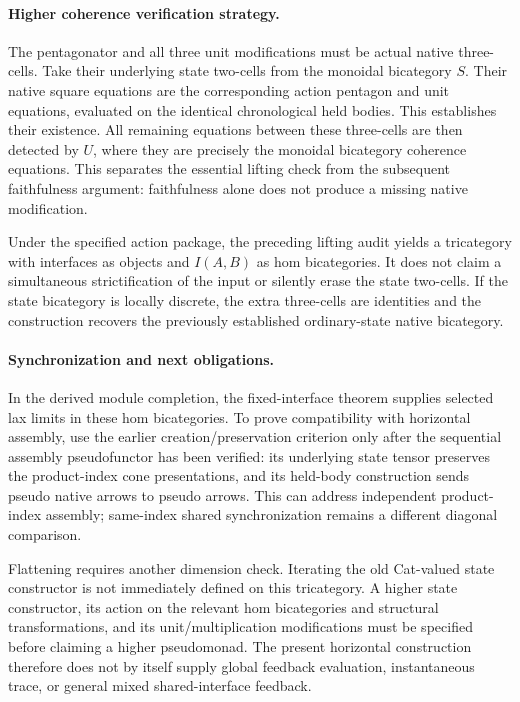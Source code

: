\documentclass{article}
\begin{document}
\paragraph{Higher coherence verification strategy.} The pentagonator and all three unit modifications must be actual native three-cells. Take their underlying state two-cells from the monoidal bicategory $S$. Their native square equations are the corresponding action pentagon and unit equations, evaluated on the identical chronological held bodies. This establishes their existence. All remaining equations between these three-cells are then detected by $U$, where they are precisely the monoidal bicategory coherence equations. This separates the essential lifting check from the subsequent faithfulness argument: faithfulness alone does not produce a missing native modification.

Under the specified action package, the preceding lifting audit yields a tricategory with interfaces as objects and $I(A,B)$ as hom bicategories. It does not claim a simultaneous strictification of the input or silently erase the state two-cells. If the state bicategory is locally discrete, the extra three-cells are identities and the construction recovers the previously established ordinary-state native bicategory.

\paragraph{Synchronization and next obligations.} In the derived module completion, the fixed-interface theorem supplies selected lax limits in these hom bicategories. To prove compatibility with horizontal assembly, use the earlier creation/preservation criterion only after the sequential assembly pseudofunctor has been verified: its underlying state tensor preserves the product-index cone presentations, and its held-body construction sends pseudo native arrows to pseudo arrows. This can address independent product-index assembly; same-index shared synchronization remains a different diagonal comparison.

Flattening requires another dimension check. Iterating the old Cat-valued state constructor is not immediately defined on this tricategory. A higher state constructor, its action on the relevant hom bicategories and structural transformations, and its unit/multiplication modifications must be specified before claiming a higher pseudomonad. The present horizontal construction therefore does not by itself supply global feedback evaluation, instantaneous trace, or general mixed shared-interface feedback.
\end{document}
